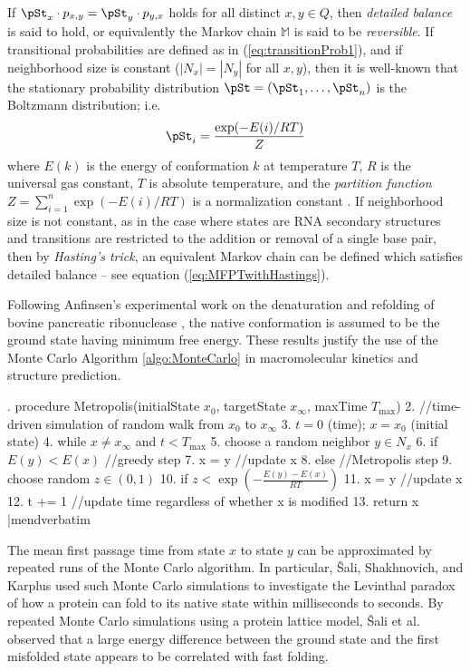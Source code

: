If $\pSt_x \cdot p_{x,y} = \pSt_y \cdot p_{y,x}$ holds for all distinct
$x,y \in Q$, then
{\em detailed balance} is said to hold, or equivalently the Markov
chain $\mathbb{M}$ is said to be {\em reversible}.
If transitional probabilities
are defined as in (\ref{eq:transitionProb1}), and if neighborhood
size is constant ($|N_x|=|N_y|$ for all $x,y$), then it is well-known
that the stationary probability distribution
$\pSt=(\pSt_1,\ldots,\pSt_n)$ is the Boltzmann distribution; i.e.
\begin{align}
\label{eq:stationaryBoltzmannProb}
\pSt_i = \frac{\exp(-E(i)/RT)}{Z}
\end{align}
where $E(k)$ is the energy of conformation $k$ at temperature $T$,
$R$ is the universal gas constant,
$T$ is absolute temperature, and the {\em partition function}
$Z = \sum_{i=1}^n \exp(-E(i)/RT)$ is a normalization constant
\cite{waterman:book,cloteBackofen:book}. If neighborhood size is not
constant, as in the case where states are RNA secondary structures and transitions
are restricted to the addition or removal of a single base pair, then
by {\em Hasting's trick}, an equivalent Markov chain can be defined which
satisfies detailed balance -- see equation (\ref{eq:MFPTwithHastings}).

Following Anfinsen's experimental work on the denaturation and
refolding of bovine pancreatic ribonuclease \cite{anfinsen},
the native conformation is assumed to be the ground state having
minimum free energy. These results justify the use of the Monte Carlo
Algorithm \ref{algo:MonteCarlo} in macromolecular kinetics and
structure prediction.


. procedure Metropolis(initialState $x_0$, targetState $x_{\infty}$, maxTime $T_{\max}$)
 2. //time-driven simulation of random walk from $x_0$ to $x_{\infty}$
 3.   $t=0$ (time); $x=x_0$ (initial state)
 4.   while $x \ne x_{\infty}$ and $t< T_{\max}$
 5.     choose a random neighbor $y \in N_x$
 6.     if $E(y)<E(x)$  //greedy step
 7.       x = y         //update x
 8.     else            //Metropolis step
 9.       choose random $z \in (0,1)$
10.       if $z < \exp\left(-\frac{E(y)-E(x)}{RT}\right)$
11.         x = y      //update x
12.     t += 1  //update time regardless of whether x is modified
13.   return x
|mendverbatim

The mean first passage time from state $x$ to state $y$ can
be approximated by repeated runs of the Monte Carlo algorithm.
In particular, \v{S}ali, Shakhnovich, and Karplus used such Monte Carlo
simulations to investigate the Levinthal paradox of how a protein
can fold to its native state within milliseconds to seconds.
By repeated Monte Carlo simulations using a protein lattice model,
\v{S}ali et al. observed that a large energy difference between
the ground state
and the first misfolded state appears to be correlated with fast folding.

